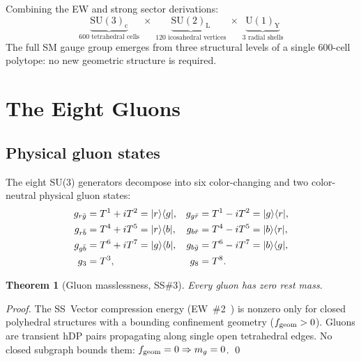 \documentclass[11pt,a4paper]{article}
\newtheorem{theorem}{Theorem}[section]
\newcommand{\ket}[1]{|#1\rangle}
\newcommand{\bra}[1]{\langle#1|}
\begin{document}
Combining the EW and strong sector derivations:
\begin{equation}
\underbrace{\mathrm{SU(3)_c}}_{\text{600 tetrahedral cells}}
\;\times\;
\underbrace{\mathrm{SU(2)_L}}_{\text{120 icosahedral vertices}}
\;\times\;
\underbrace{\mathrm{U(1)_Y}}_{\text{3 radial shells}}
\label{eq:SM_gauge}
\end{equation}
The full SM gauge group emerges from three structural levels of a
single 600-cell polytope: no new geometric structure is required.

\section{The Eight Gluons}
\label{sec:gluons}

\subsection{Physical gluon states}

The eight SU(3) generators decompose into six color-changing and
two color-neutral physical gluon states:
\begin{align}
g_{r\bar{g}} &= T^1+iT^2 = \ket{r}\bra{g}, &
g_{g\bar{r}} &= T^1-iT^2 = \ket{g}\bra{r}, \notag\\
g_{r\bar{b}} &= T^4+iT^5 = \ket{r}\bra{b}, &
g_{b\bar{r}} &= T^4-iT^5 = \ket{b}\bra{r}, \notag\\
g_{g\bar{b}} &= T^6+iT^7 = \ket{g}\bra{b}, &
g_{b\bar{g}} &= T^6-iT^7 = \ket{b}\bra{g}, \notag\\
g_3 &= T^3, & g_8 &= T^8. \label{eq:gluons}
\end{align}

\begin{theorem}[Gluon masslessness, SS\#3]
\label{thm:massless}
Every gluon has zero rest mass.
\end{theorem}

\begin{proof}
The SS~Vector compression energy (EW~\#2~\citep{cpp_ew2})
is nonzero only for closed polyhedral structures with a bounding
confinement geometry ($f_{\rm geom} > 0$).  Gluons are transient
hDP pairs propagating along single open tetrahedral edges.  No
closed subgraph bounds them: $f_{\rm geom} = 0 \Rightarrow m_g = 0$.
\qed
\end{proof}
\end{document}
